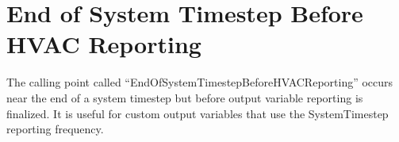 \section{End of System Timestep Before HVAC Reporting}\label{end-of-system-timestep-before-hvac-reporting}

The calling point called ``EndOfSystemTimestepBeforeHVACReporting'' occurs near the end of a system timestep but before output variable reporting is finalized. It is useful for custom output variables that use the SystemTimestep reporting frequency.
